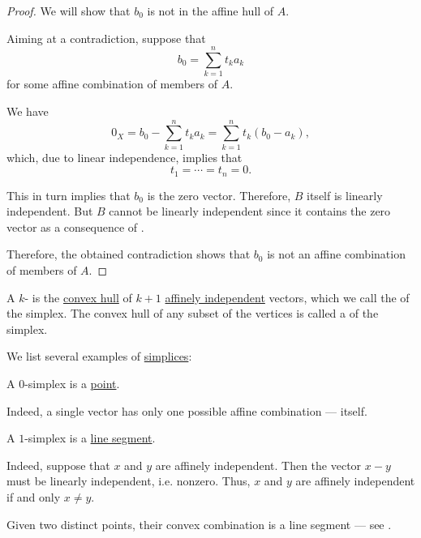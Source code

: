 \begin{proof}
  We will show that \( b_0 \) is not in the affine hull of \( A \).

  Aiming at a contradiction, suppose that
  \begin{equation*}
    b_0 = \sum_{k=1}^n t_k a_k
  \end{equation*}
  for some affine combination of members of \( A \).

  We have
  \begin{equation*}
    0_X
    =
    b_0 - \sum_{k=1}^n t_k a_k
    =
    \sum_{k=1}^n t_k (b_0 - a_k),
  \end{equation*}
  which, due to linear independence, implies that
  \begin{equation*}
    t_1 = \cdots = t_n = 0.
  \end{equation*}

  This in turn implies that \( b_0 \) is the zero vector. Therefore, \( B \) itself is linearly independent. But \( B \) cannot be linearly independent since it contains the zero vector as a consequence of .

  Therefore, the obtained contradiction shows that \( b_0 \) is not an affine combination of members of \( A \).
\end{proof}

\begin{definition}\label{def:simplex}
  A \( k \)- is the \hyperref[def:convex_hull]{convex hull} of \( k + 1 \) \hyperref[def:affine_dependence]{affinely independent} vectors, which we call the  of the simplex. The convex hull of any subset of the vertices is called a  of the simplex.
\end{definition}

\begin{example}\label{ex:def:simplex}
  We list several examples of \hyperref[def:simplex]{simplices}:
  \begin{thmenum}
     A \( 0 \)-simplex is a \hyperref[rem:point]{point}.

    Indeed, a single vector has only one possible affine combination --- itself.

     A \( 1 \)-simplex is a \hyperref[def:line_segment]{line segment}.

    Indeed, suppose that \( x \) and \( y \) are affinely independent. Then the vector \( x - y \) must be linearly independent, i.e. nonzero. Thus, \( x \) and \( y \) are affinely independent if and only \( x \neq y \).

    Given two distinct points, their convex combination is a line segment --- see .
  \end{thmenum}
\end{example}
